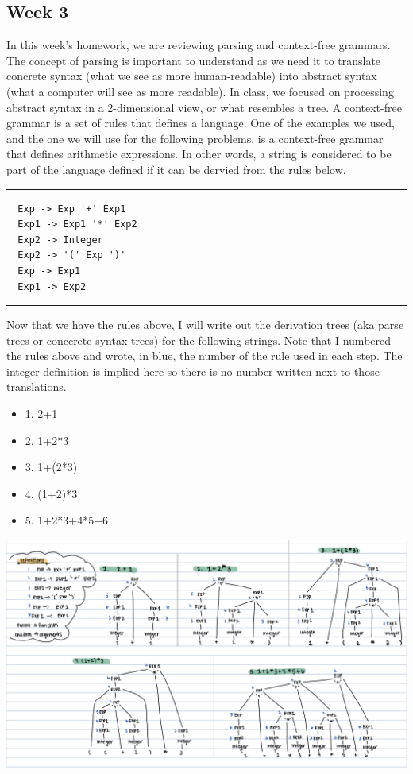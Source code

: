 \documentclass{article}
\theoremstyle{theorem}
\theoremstyle{definition}
\theoremstyle{remark}
\begin{document}
\subsection{Week 3}
In this week's homework, we are reviewing parsing and context-free grammars. The concept of parsing is important to understand as we need it to translate concrete syntax (what we see as more human-readable) into abstract syntax (what a computer will see as more readable). 
In class, we focused on processing abstract syntax in a 2-dimensional view, or what resembles a tree. A context-free grammar is a set of rules that defines a language. One of the examples we used, and the one we will use for the following problems, is a context-free grammar that 
defines arithmetic expressions. In other words, a string is considered to be part of the language defined if it can be dervied from the rules below. \\
\noindent
  {\color{gray} \rule{\linewidth}{0.05mm}}
\begin{verbatim}
  Exp -> Exp '+' Exp1
  Exp1 -> Exp1 '*' Exp2
  Exp2 -> Integer 
  Exp2 -> '(' Exp ')'
  Exp -> Exp1
  Exp1 -> Exp2
\end{verbatim}
\noindent
  {\color{gray} \rule{\linewidth}{0.05mm}}

Now that we have the rules above, I will write out the derivation trees (aka parse trees or conccrete syntax trees) for the following strings. Note that I numbered the rules above and wrote, in blue, the number of the rule used in each step. The integer definition is implied here so there is no 
number written next to those translations. 
\begin{itemize}
  \item[\ding{99}] 1. 2+1
  \item[\ding{99}] 2. 1+2*3
  \item[\ding{99}] 3. 1+(2*3)
  \item[\ding{99}] 4. (1+2)*3
  \item[\ding{99}] 5. 1+2*3+4*5+6
\end{itemize}

\begin{center}
  \includegraphics[scale=0.3]{parsing_arithmetic.jpg}
\end{center}
\end{document}
